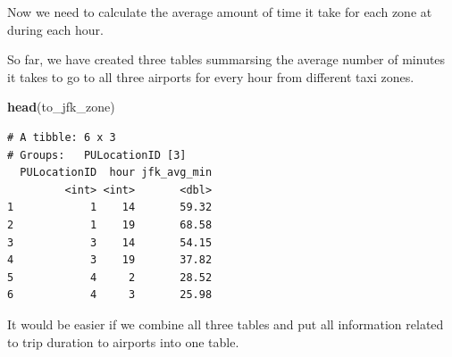 \documentclass[12pt,twoside]{reedthesis}
\newenvironment{Shaded}{\begin{snugshade}}{\end{snugshade}}
\newcommand{\KeywordTok}[1]{\textcolor[rgb]{0.13,0.29,0.53}{\textbf{#1}}}
\newcommand{\DataTypeTok}[1]{\textcolor[rgb]{0.13,0.29,0.53}{#1}}
\newcommand{\StringTok}[1]{\textcolor[rgb]{0.31,0.60,0.02}{#1}}
\newcommand{\OperatorTok}[1]{\textcolor[rgb]{0.81,0.36,0.00}{\textbf{#1}}}
\newcommand{\NormalTok}[1]{#1}
\theoremstyle{definition}
\theoremstyle{definition}
\theoremstyle{definition}
\theoremstyle{remark}
\begin{document}
Now we need to calculate the average amount of time it take for each
zone at during each hour.
\begin{Shaded}
\end{Shaded}
So far, we have created three tables summarsing the average number of
minutes it takes to go to all three airports for every hour from
different taxi zones.
\begin{Shaded}
\begin{Highlighting}[]
\KeywordTok{head}\NormalTok{(to_jfk_zone)}
\end{Highlighting}
\end{Shaded}
\begin{verbatim}
# A tibble: 6 x 3
# Groups:   PULocationID [3]
  PULocationID  hour jfk_avg_min
         <int> <int>       <dbl>
1            1    14       59.32
2            1    19       68.58
3            3    14       54.15
4            3    19       37.82
5            4     2       28.52
6            4     3       25.98
\end{verbatim}
It would be easier if we combine all three tables and put all
information related to trip duration to airports into one table.
\end{document}
